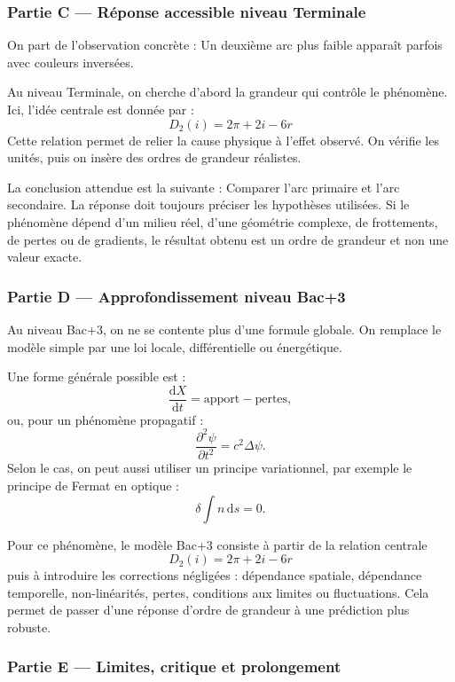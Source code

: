 \documentclass[11pt,a4paper]{article}
\begin{document}
\subsubsection*{Partie C — Réponse accessible niveau Terminale}

\begin{corrigebox}
On part de l'observation concrète : Un deuxième arc plus faible apparaît parfois avec couleurs inversées.

Au niveau Terminale, on cherche d'abord la grandeur qui contrôle le phénomène. Ici, l'idée centrale est donnée par :
\[
D_2(i)=2\pi+2i-6r
\]
Cette relation permet de relier la cause physique à l'effet observé. On vérifie les unités, puis on insère des ordres de grandeur réalistes.

La conclusion attendue est la suivante : Comparer l'arc primaire et l'arc secondaire. La réponse doit toujours préciser les hypothèses utilisées. Si le phénomène dépend d'un milieu réel, d'une géométrie complexe, de frottements, de pertes ou de gradients, le résultat obtenu est un ordre de grandeur et non une valeur exacte.
\end{corrigebox}

\subsubsection*{Partie D — Approfondissement niveau Bac+3}

\begin{approfondissementbox}
Au niveau Bac+3, on ne se contente plus d'une formule globale. On remplace le modèle simple par une loi locale, différentielle ou énergétique.

Une forme générale possible est :
\[
\frac{\mathrm d X}{\mathrm dt}=\text{apport}-\text{pertes},
\]
ou, pour un phénomène propagatif :
\[
\frac{\partial^2 \psi}{\partial t^2}=c^2\Delta\psi.
\]
Selon le cas, on peut aussi utiliser un principe variationnel, par exemple le principe de Fermat en optique :
\[
\delta \int n\,\mathrm ds=0.
\]

Pour ce phénomène, le modèle Bac+3 consiste à partir de la relation centrale
\[
D_2(i)=2\pi+2i-6r
\]
puis à introduire les corrections négligées : dépendance spatiale, dépendance temporelle, non-linéarités, pertes, conditions aux limites ou fluctuations. Cela permet de passer d'une réponse d'ordre de grandeur à une prédiction plus robuste.
\end{approfondissementbox}

\subsubsection*{Partie E — Limites, critique et prolongement}
\end{document}
